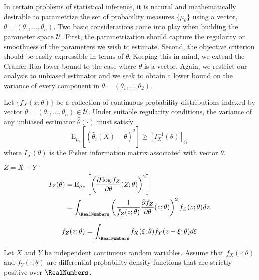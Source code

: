 In certain problems of statistical inference, it is natural and mathematically desirable to parametrize the set of probability measures $\{ \mu_{\theta} \}$ using a vector, $\theta = (\theta_1, \ldots, \theta_n)$.
Two basic considerations come into play when building the parameter space $\mathcal{U}$.
First, the parametrization should capture the regularity or smoothness of the parameters we wish to estimate.
Second, the objective criterion should be easily expressible in terms of $\theta$.
Keeping this in mind, we extend the Cramer-Rao lower bound to the case where $\theta$ is a vector.
Again, we restrict our analysis to unbiased estimator and we seek to obtain a lower bound on the variance of every component in $\theta = (\theta_1, \ldots, \theta_2)$.

\begin{theorem}
Let $\{ f_X (x; \theta) \}$ be a collection of continuous probability distributions indexed by vector $\theta = (\theta_1, \ldots, \theta_n) \in \mathcal{U}$.
Under suitable regularity conditions, the variance of any unbiased estimator $\hat{\theta} (\cdot)$ must satisfy
\begin{equation*}
\mathrm{E}_{\mu_{\theta}} \left[ \left( \hat{\theta}_i (X) - \theta \right)^2 \right]
\geq \left[ I_X^{-1} (\theta) \right]_{ii}
\end{equation*}
where $I_X(\theta)$ is the Fisher information matrix associated with vector $\theta$.
\end{theorem}


\newpage
$Z = X + Y$
\begin{equation*}
\begin{split}
I_Z (\theta)
&= \mathrm{E}_{\mu_{\theta}} \left[ \left( \frac{\partial \log f_Z}{\partial \theta} (Z; \theta) \right)^2 \right] \\
&= \int_{\RealNumbers} \left( \frac{1}{f_Z (z; \theta)} \frac{\partial f_Z}{\partial \theta} (z; \theta) \right)^2 f_Z (z; \theta) dz
\end{split}
\end{equation*}

\begin{equation*}
f_Z (z; \theta) = \int_{\RealNumbers} f_X (\xi; \theta) f_Y (z - \xi; \theta) d\xi
\end{equation*}

\begin{theorem}
Let $X$ and $Y$ be independent continuous random variables.
Assume that $f_X(\cdot; \theta)$ and $f_Y(\cdot; \theta)$ are differential probability density functions that are strictly positive over $\RealNumbers$.
\end{theorem}

